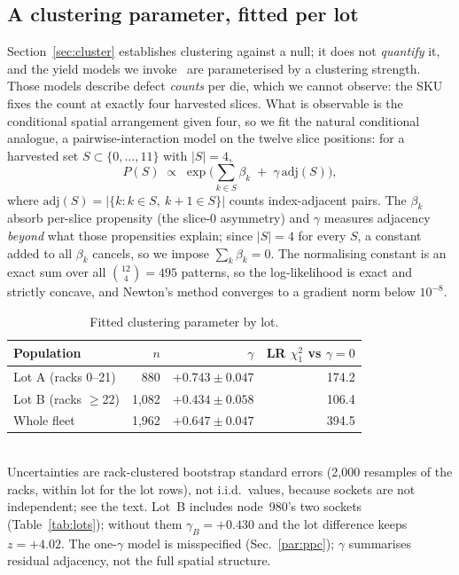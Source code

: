 \documentclass[10pt,conference]{IEEEtran}
\begin{document}
\subsection{A clustering parameter, fitted per lot}
\label{sec:yield}
Section~\ref{sec:cluster} establishes clustering against a null; it does not \emph{quantify} it,
and the yield models we invoke~\cite{koren1993negbinom,bae2007waferyield} are parameterised by a
clustering strength. Those models describe defect \emph{counts} per die, which we cannot observe:
the SKU fixes the count at exactly four harvested slices. What is observable is the conditional
spatial arrangement given four, so we fit the natural conditional analogue, a pairwise-interaction
model on the twelve slice positions: for a harvested set $S\subset\{0,\dots,11\}$ with $|S|=4$,
\[
  P(S)\;\propto\;\exp\Big(\textstyle\sum_{k\in S}\beta_k \;+\; \gamma\,\mathrm{adj}(S)\Big),
\]
where $\mathrm{adj}(S)=|\{k: k\in S,\ k{+}1\in S\}|$ counts index-adjacent pairs. The $\beta_k$
absorb per-slice propensity (the slice-0 asymmetry) and $\gamma$ measures adjacency \emph{beyond}
what those propensities explain; since $|S|=4$ for every $S$, a constant added to all $\beta_k$
cancels, so we impose $\sum_k\beta_k=0$. The normalising constant is an exact sum over all
$\binom{12}{4}=495$ patterns, so the log-likelihood is exact and strictly concave, and Newton's
method converges to a gradient norm below $10^{-8}$.

\begin{table}[h]\centering\caption{Fitted clustering parameter by lot.}
\label{tab:yield}
\begin{tabular}{lrrr}\toprule
Population & $n$ & $\gamma$ & LR $\chi^2_1$ vs $\gamma{=}0$\\\midrule
Lot A (racks 0--21)  & 880 & $+0.743\pm0.047$ & 174.2\\
Lot B (racks $\ge$22)  & 1{,}082 & $+0.434\pm0.058$ & 106.4\\
Whole fleet          & 1{,}962 & $+0.647\pm0.047$ & 394.5\\
\bottomrule\end{tabular}
\\[2pt]\footnotesize Uncertainties are rack-clustered bootstrap standard errors (2{,}000
resamples of the racks, within lot for the lot rows), not i.i.d.\ values, because sockets are not
independent; see the text. Lot~B includes node~980's two sockets (Table~\ref{tab:lots}); without
them $\gamma_B=+0.430$ and the lot difference keeps $z=+4.02$. The one-$\gamma$ model is
misspecified (Sec.~\ref{par:ppc}); $\gamma$ summarises residual adjacency, not the full spatial
structure.
\end{table}
\end{document}
